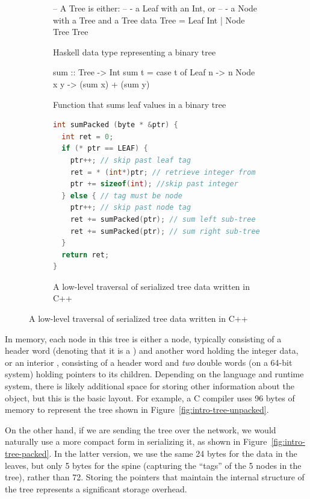 \begin{figure}
\begin{subfigure}{\textwidth}
\begin{code}
-- A Tree is either:
--  - a Leaf with an Int, or
--  - a Node with a Tree and a Tree
data Tree = Leaf Int | Node Tree Tree
\end{code}
\caption{Haskell data type representing a binary tree}
\label{fig:haskell_tree}
\end{subfigure}
\begin{subfigure}{\textwidth}
\begin{code}
sum :: Tree -> Int
sum t = case t of
          Leaf n   -> n
          Node x y -> (sum x) + (sum y)
\end{code}
\caption{Function that sums leaf values in a binary tree}
\label{fig:haskell_sumtree}
\end{subfigure}
\begin{subfigure}{\textwidth}
\begin{lstlisting}[language=C++]
int sumPacked (byte * &ptr) {
  int ret = 0;
  if (* ptr == LEAF) {
    ptr++; // skip past leaf tag
    ret = * (int*)ptr; // retrieve integer from leaf
    ptr += sizeof(int); //skip past integer
  } else { // tag must be node
    ptr++; // skip past node tag
    ret += sumPacked(ptr); // sum left sub-tree
    ret += sumPacked(ptr); // sum right sub-tree
  }
  return ret;
}
\end{lstlisting}
\caption{A low-level traversal of serialized tree data written in C++}
\label{fig:cpp-example}
\end{subfigure}

\end{figure}

In memory, each node in this tree is either a  node, typically
consisting of a header word (denoting that it is a ) and another word
holding the integer data, or an interior , consisting of a header word
and {\em two} double words (on a 64-bit system) holding pointers to its
children. Depending on the language and runtime system, there is likely additional
space for storing other information about the object, but this is the basic layout.
%
For example, a C
compiler uses 96 bytes
of memory to represent the tree shown in
Figure~\ref{fig:intro-tree-unpacked}.

On the other hand, if we are
sending the tree over the network, we would naturally use a more
compact form in serializing it, as shown in
Figure~\ref{fig:intro-tree-packed}.  In the latter version, we use the
same 24 bytes for the data in the leaves, but only 5 bytes for the
spine (capturing the ``tags'' of the 5 nodes in the tree), rather than
72.  
Storing the pointers that maintain
the internal structure of the tree represents a significant storage overhead.


